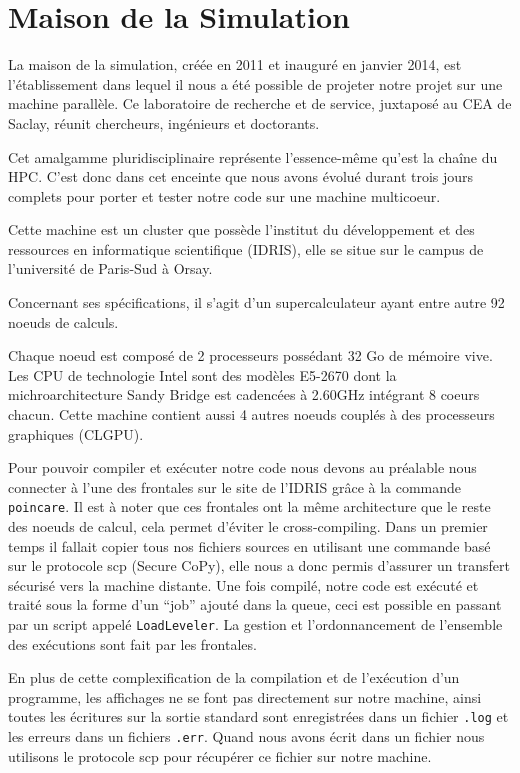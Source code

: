 \section{Maison de la Simulation}

La maison de la simulation,
créée en 2011 et inauguré en janvier 2014,
est l'établissement dans lequel il nous a été possible
de projeter notre projet sur une machine parallèle.
Ce laboratoire de recherche et de service,
juxtaposé au CEA de Saclay,
réunit chercheurs, ingénieurs et doctorants.

Cet amalgamme pluridisciplinaire représente
l'essence-même qu'est la chaîne du HPC.
C'est donc dans cet enceinte que nous avons évolué
durant trois jours complets pour porter et tester notre
code sur une machine multicoeur.

Cette machine est un cluster que possède
l'institut du développement et des ressources en
informatique scientifique (IDRIS),
elle se situe sur le campus de l'université de Paris-Sud à Orsay.

Concernant ses spécifications, il s'agit d'un supercalculateur
ayant entre autre 92 noeuds de calculs.

Chaque noeud est composé de 2 processeurs possédant
32 Go de mémoire vive.
Les CPU de technologie Intel sont des modèles E5-2670
dont la michroarchitecture Sandy Bridge est
cadencées à 2.60GHz intégrant 8 coeurs chacun.
Cette machine contient aussi 4 autres noeuds
couplés à des processeurs graphiques (CLGPU).

Pour pouvoir compiler et exécuter notre code
nous devons au préalable nous connecter à
l'une des frontales sur le site de l'IDRIS
grâce à la commande {\tt poincare}.
Il est à noter que ces frontales ont la même architecture
que le reste des noeuds de calcul,
cela permet d'éviter le cross-compiling.
Dans un premier temps il fallait copier tous nos fichiers sources
en utilisant une commande basé sur le protocole scp (Secure CoPy),
elle nous a donc permis d'assurer un transfert sécurisé
vers la machine distante.
Une fois compilé, notre code est exécuté et traité sous la forme
d'un ``job'' ajouté dans la queue,
ceci est possible en passant par un script appelé {\tt LoadLeveler}.
La gestion et l'ordonnancement de l'ensemble des exécutions sont
fait par les frontales.

En plus de cette complexification de la compilation
et de l'exécution d'un programme,
les affichages ne se font pas directement sur notre machine,
ainsi toutes les écritures sur la sortie standard sont
enregistrées dans un fichier {\tt .log}
et les erreurs dans un fichiers {\tt .err}.
Quand nous avons écrit dans un fichier nous utilisons
le protocole scp pour récupérer ce fichier sur notre machine.

